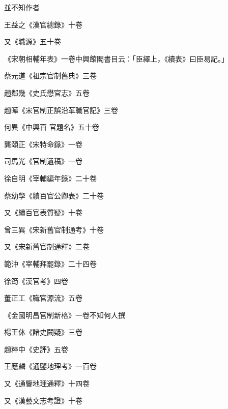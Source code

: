 \begin{pinyinscope}
 並不知作者



 王益之《漢官總錄》十卷



 又《職源》五十卷



 《宋朝相輔年表》一卷中興館閣書目云：「臣繹上，《續表》曰臣易記。」



 蔡元道《祖宗官制舊典》三卷



 趙鄰幾《史氏懋官志》五卷



 趙曄《宋官制正誤沿革職官記》三卷



 何異《中興百
 官題名》五十卷



 龔頤正《宋特命錄》一卷



 司馬光《官制遺稿》一卷



 徐自明《宰輔編年錄》二十卷



 蔡幼學《續百官公卿表》二十卷



 又《續百官表質疑》十卷



 曾三異《宋新舊官制通考》十卷



 又《宋新舊官制通釋》二卷



 範沖《宰輔拜罷錄》二十四卷



 徐筠《漢官考》四卷



 董正工《職官源流》五卷



 《金國明昌官制新格》一卷不知何人撰



 楊王休《諸史闕疑》三卷



 趙粹中《史評》五卷



 王應麟《通鑒地理考》一百卷



 又《通鑒地理通釋》十四卷



 又《漢藝文志考證》十卷




\end{pinyinscope}
